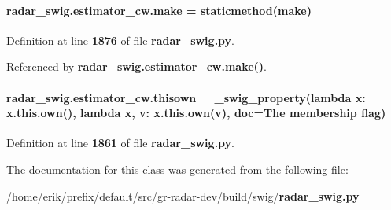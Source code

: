 \paragraph[{make}]{\setlength{\rightskip}{0pt plus 5cm}radar\+\_\+swig.\+estimator\+\_\+cw.\+make = staticmethod(make)\hspace{0.3cm}{\ttfamily [static]}}\label{classradar__swig_1_1estimator__cw_ac49d2da323345e42080cda11e6eee721}


Definition at line {\bf 1876} of file {\bf radar\+\_\+swig.\+py}.



Referenced by {\bf radar\+\_\+swig.\+estimator\+\_\+cw.\+make()}.

\paragraph[{thisown}]{\setlength{\rightskip}{0pt plus 5cm}radar\+\_\+swig.\+estimator\+\_\+cw.\+thisown = {\bf \+\_\+swig\+\_\+property}(lambda x\+: x.\+this.\+own(), lambda {\bf x}, v\+: x.\+this.\+own(v), doc=\textquotesingle{}The membership flag\textquotesingle{})\hspace{0.3cm}{\ttfamily [static]}}\label{classradar__swig_1_1estimator__cw_a74011612febc32d50f43a8e935183d1d}


Definition at line {\bf 1861} of file {\bf radar\+\_\+swig.\+py}.



The documentation for this class was generated from the following file\+:\begin{DoxyCompactItemize}
\item 
/home/erik/prefix/default/src/gr-\/radar-\/dev/build/swig/{\bf radar\+\_\+swig.\+py}\end{DoxyCompactItemize}
